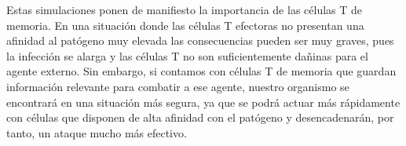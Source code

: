 Estas simulaciones ponen de manifiesto la importancia de las células T de memoria. En una situación donde las células T efectoras no presentan una afinidad al patógeno muy elevada las consecuencias pueden ser muy graves, pues la infección se alarga y las células T no son suficientemente dañinas para el agente externo. Sin embargo, si contamos con células T de memoria que guardan información relevante para combatir a ese agente, nuestro organismo se encontrará en una situación más segura, ya que se podrá actuar más rápidamente con células que disponen de alta afinidad con el patógeno y desencadenarán, por tanto, un ataque mucho más efectivo.




